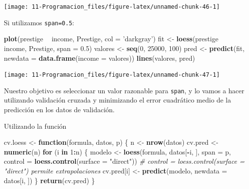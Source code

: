 \documentclass[]{book}
\newenvironment{Shaded}{\begin{snugshade}}{\end{snugshade}}
\newcommand{\CommentTok}[1]{\textcolor[rgb]{0.56,0.35,0.01}{\textit{#1}}}
\newcommand{\ControlFlowTok}[1]{\textcolor[rgb]{0.13,0.29,0.53}{\textbf{#1}}}
\newcommand{\DataTypeTok}[1]{\textcolor[rgb]{0.13,0.29,0.53}{#1}}
\newcommand{\DecValTok}[1]{\textcolor[rgb]{0.00,0.00,0.81}{#1}}
\newcommand{\FloatTok}[1]{\textcolor[rgb]{0.00,0.00,0.81}{#1}}
\newcommand{\KeywordTok}[1]{\textcolor[rgb]{0.13,0.29,0.53}{\textbf{#1}}}
\newcommand{\NormalTok}[1]{#1}
\newcommand{\OperatorTok}[1]{\textcolor[rgb]{0.81,0.36,0.00}{\textbf{#1}}}
\newcommand{\StringTok}[1]{\textcolor[rgb]{0.31,0.60,0.02}{#1}}
\begin{document}
\begin{center}\texttt{[image: 11-Programacion\_files/figure-latex/unnamed-chunk-46-1]} \end{center}

Si utilizamos \texttt{span=0.5}:

\begin{Shaded}
\begin{Highlighting}[]
\KeywordTok{plot}\NormalTok{(prestige }\OperatorTok{~}\StringTok{ }\NormalTok{income, Prestige, }\DataTypeTok{col =} \StringTok{'darkgray'}\NormalTok{)}
\NormalTok{fit <-}\StringTok{ }\KeywordTok{loess}\NormalTok{(prestige }\OperatorTok{~}\StringTok{ }\NormalTok{income, Prestige, }\DataTypeTok{span =} \FloatTok{0.5}\NormalTok{)}
\NormalTok{valores <-}\StringTok{ }\KeywordTok{seq}\NormalTok{(}\DecValTok{0}\NormalTok{, }\DecValTok{25000}\NormalTok{, }\DecValTok{100}\NormalTok{)}
\NormalTok{pred <-}\StringTok{ }\KeywordTok{predict}\NormalTok{(fit, }\DataTypeTok{newdata =} \KeywordTok{data.frame}\NormalTok{(}\DataTypeTok{income =}\NormalTok{ valores))}
\KeywordTok{lines}\NormalTok{(valores, pred)}
\end{Highlighting}
\end{Shaded}

\begin{center}\texttt{[image: 11-Programacion\_files/figure-latex/unnamed-chunk-47-1]} \end{center}

Nuestro objetivo es seleccionar un valor razonable para \texttt{span}, y lo vamos a
hacer utilizando validación cruzada y minimizando el error cuadrático medio
de la predicción en los datos de validación.

Utilizando la función

\begin{Shaded}
\begin{Highlighting}[]
\NormalTok{cv.loess <-}\StringTok{ }\ControlFlowTok{function}\NormalTok{(formula, datos, p) \{}
\NormalTok{  n <-}\StringTok{ }\KeywordTok{nrow}\NormalTok{(datos)}
\NormalTok{  cv.pred <-}\StringTok{ }\KeywordTok{numeric}\NormalTok{(n)}
  \ControlFlowTok{for}\NormalTok{ (i }\ControlFlowTok{in} \DecValTok{1}\OperatorTok{:}\NormalTok{n) \{}
\NormalTok{    modelo <-}\StringTok{ }\KeywordTok{loess}\NormalTok{(formula, datos[}\OperatorTok{-}\NormalTok{i, ], }\DataTypeTok{span =}\NormalTok{ p, }
                    \DataTypeTok{control =} \KeywordTok{loess.control}\NormalTok{(}\DataTypeTok{surface =} \StringTok{"direct"}\NormalTok{))}
    \CommentTok{# control = loess.control(surface = "direct") permite extrapolaciones}
\NormalTok{    cv.pred[i] <-}\StringTok{ }\KeywordTok{predict}\NormalTok{(modelo, }\DataTypeTok{newdata =}\NormalTok{ datos[i, ])}
\NormalTok{  \}}
  \KeywordTok{return}\NormalTok{(cv.pred)}
\NormalTok{\}}
\end{Highlighting}
\end{Shaded}
\end{document}
